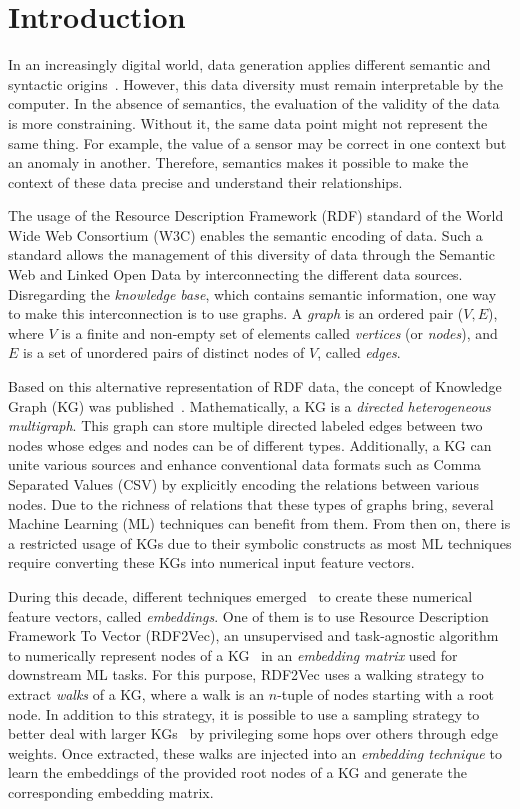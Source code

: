 
\chapter{Introduction}
\label{chap:introduction}

In an increasingly digital world, data generation applies different semantic and
syntactic origins~\citep{DBLP:journals/jodsn/CeravoloAACCDMK18}. However, this
data diversity must remain interpretable by the computer. In the absence of
semantics, the evaluation of the validity of the data is more
constraining. Without it, the same data point might not represent the same
thing. For example, the value of a sensor may be correct in one context but an
anomaly in another. Therefore, semantics makes it possible to make the context
of these data precise and understand their relationships.

The usage of the Resource Description Framework (RDF) standard of the World Wide
Web Consortium (W3C) enables the semantic encoding of data. Such a standard
allows the management of this diversity of data through the Semantic Web and
Linked Open Data by interconnecting the different data sources. Disregarding the
\emph{knowledge base}, which contains semantic information, one way to make this
interconnection is to use graphs. A \emph{graph} is an ordered pair ($V, E$),
where $V$ is a finite and non-empty set of elements called \emph{vertices} (or
\emph{nodes}), and $E$ is a set of unordered pairs of distinct nodes of $V$,
called \emph{edges}.

Based on this alternative representation of RDF data, the concept of Knowledge
Graph (KG) was published~\citep{singhal_2012}. Mathematically, a KG is a
\emph{directed heterogeneous multigraph}. This graph can store multiple directed
labeled edges between two nodes whose edges and nodes can be of different
types. Additionally, a KG can unite various sources and enhance conventional
data formats such as Comma Separated Values (CSV) by explicitly encoding the
relations between various nodes. Due to the richness of relations that these
types of graphs bring, several Machine Learning (ML) techniques can benefit from
them. From then on, there is a restricted usage of KGs due to their symbolic
constructs as most ML techniques require converting these KGs into numerical
input feature vectors.

During this decade, different techniques
emerged~\citep{inproceedings:ristoski:strategies} to create these numerical
feature vectors, called \emph{embeddings}. One of them is to use Resource
Description Framework To Vector (RDF2Vec), an unsupervised and task-agnostic
algorithm to numerically represent nodes of a
KG~\citep{article:ristoski:rdf2vec} in an \emph{embedding matrix} used for
downstream ML tasks. For this purpose, RDF2Vec uses a walking strategy to
extract \emph{walks} of a KG, where a walk is an $n$-tuple of nodes starting
with a root node. In addition to this strategy, it is possible to use a sampling
strategy to better deal with larger KGs~\citep{inproceedings:cochez} by
privileging some hops over others through edge weights. Once extracted, these
walks are injected into an \emph{embedding technique} to learn the embeddings of
the provided root nodes of a KG and generate the corresponding embedding matrix.

